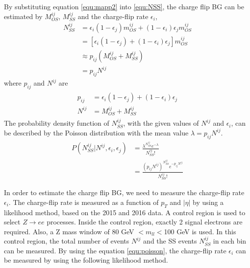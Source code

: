 By substituting equation \ref{equ:mapp2} into \ref{equ:NSS}, the charge flip BG can be estimated by $M^{ij}_{OS}$, $M^{ij}_{SS}$ and the charge-flip rate $\epsilon_i$,
\begin{align}
N^{ij}_{SS} &= \epsilon_i (1-\epsilon_j) m^{ij}_{OS} + (1-\epsilon_i) \epsilon_j m^{ij}_{OS} \\
&= [ \epsilon_i (1-\epsilon_j) + (1-\epsilon_i) \epsilon_j ] m^{ij}_{OS} \label{equ:NSS3}\\
&\approx p_{ij} (M^{ij}_{OS} + M^{ij}_{SS}) \\
&=p_{ij} N^{ij}
\label{equ:NSS2}
\end{align}
where $p_{ij}$ and $N^{ij}$ are
\begin{align}
\begin{split}
p_{ij} &= \epsilon_i (1-\epsilon_j) + (1-\epsilon_i) \epsilon_j \\
N^{ij} &= M^{ij}_{OS} + M^{ij}_{SS}
\end{split}
\end{align}
The probability density function of $N^{ij}_{SS}$, with the given values of $N^{ij}$ and $\epsilon_i$, can be described by the Poisson distribution with the mean value $\lambda = p_{ij} N^{ij}$.
\begin{align}
P(N^{ij}_{SS}|N^{ij},\epsilon_i,\epsilon_j) &= \frac{ \lambda^{N^{ij}_{SS}} e^{-\lambda} }{N^{ij}_{SS}!} \\
 &= \frac{ (p_{ij} N^{ij})^{N^{ij}_{SS}} e^{- p_{ij} N^{ij}} }{N^{ij}_{SS}!}
\label{equ:poisson}
\end{align}

In order to estimate the charge flip BG, we need to measure the charge-flip rate $\epsilon_i$.
The charge-flip rate is measured as a function of $p_T$ and $|\eta|$ by using a likelihood method, based on the 2015 and 2016 data.
A control region is used to select $Z \rightarrow ee$ processes.
Inside the control region, exactly 2 signal electrons are required.
Also, a Z mass window of 80 GeV $<m_{ll}<$100 GeV is used.
In this control region, the total number of events $N^{ij}$ and the SS events $N^{ij}_{SS}$ in each bin can be measured.
By using the equation \ref{equ:poisson}, the charge-flip rate $\epsilon_i$ can be measured by using the following likelihood method.

